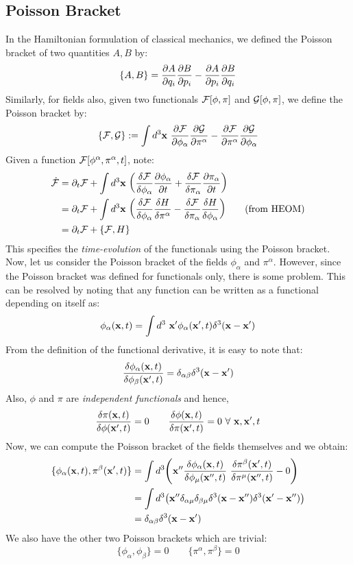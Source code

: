 \subsection{Poisson Bracket}
In the Hamiltonian formulation of classical mechanics, we defined the Poisson bracket of two quantities $A,B$ by:
$$\{A,B\} = \pdv{A}{q_i}\pdv{B}{p_i} -  \pdv{A}{p_i}\pdv{B}{q_i}$$
Similarly, for fields also, given two functionals $\mathcal F[\phi,\pi]$ and $\mathcal G[\phi,\pi]$, we define the Poisson bracket by:
$$\{\SF,\SG\}:= \int d^3\vb{x}\ \pdv{\SF}{\phi_\alpha}\pdv{\SG}{\pi^\alpha} -  \pdv{\SF}{\pi^\alpha}\pdv{\SG}{\phi_\alpha}$$
Given a function $\mathcal F[\phi^\alpha, \pi^\alpha,t]$, note:
\begin{align*}
    \dot{\SF} &= \partial_t\SF + \int d^3\vb{x}\ \qty(\fdv{\SF}{\phi_\alpha}\pdv{\phi_{\alpha}}{t} +\fdv{\SF}{\pi_\alpha}\pdv{\pi_{\alpha}}{t})\\
    &= \partial_t\SF + \int d^3\vb{x}\ \qty(\fdv{\SF}{\phi_\alpha}\fdv{H}{\pi^\alpha}-\fdv{\SF}{\pi_\alpha}\fdv{H}{\phi_\alpha})\qquad (\text{from HEOM})\\
    &=\partial_t\SF+\{\SF,H\}
\end{align*}
This specifies the \textit{time-evolution} of the functionals using the Poisson bracket. Now, let us consider the Poisson bracket of the fields $\phi_\alpha$ and $\pi^\alpha$. However, since the Poisson bracket was defined for functionals only, there is some problem. This can be resolved by noting that any function can be written as a functional depending on itself as:
$$\phi_\alpha(\vb{x},t) = \int d^3 \ \vb{x}' \phi_\alpha(\vb{x}',t)\delta^3(\vb{x}-\vb{x}')$$
From the definition of the functional derivative, it is easy to note that:
$$\frac{\delta \phi_\alpha(\vb{x},t)}{\delta \phi_\beta(\vb{x}',t)}=\delta_{\alpha\beta}\delta^3(\vb{x}-\vb{x}')$$
Also, $\phi$ and $\pi$ are \textit{independent functionals} and hence,
$$\frac{\delta \pi (\vb{x},t)}{\delta \phi(\vb{x}',t)} = 0 \qquad \frac{\delta \phi(\vb{x},t)}{\delta \pi(\vb{x}',t)}=0 \ \forall \ \vb{x},\vb{x}', t$$
Now, we can compute the Poisson bracket of the fields themselves and we obtain:
\begin{align*}
    \{\phi_\alpha(\vb{x},t), \pi^\beta(\vb{x}',t)\} &= \int d^3 \qty(\vb{x}'' \frac{\delta \phi_\alpha(\vb{x},t)}{\delta \phi_\mu(\vb{x}'',t)} \  \frac{\delta \pi^\beta(\vb{x}',t)}{\delta \pi^\mu(\vb{x}'',t)}-0)\\
    &=\int d^3 \qty(\vb{x}'' \delta_{\alpha\mu}\delta_{\beta \mu}\delta^3(\vb{x}-\vb{x}'')\delta^3(\vb{x}'-\vb{x}''))\\
    &=\delta_{\alpha\beta}\delta^3(\vb{x}-\vb{x}')
\end{align*}
We also have the other two Poisson brackets which are trivial:
$$\{\phi_\alpha, \phi_\beta\}= 0 \qquad  \{\pi^\alpha, \pi^\beta\}= 0 $$